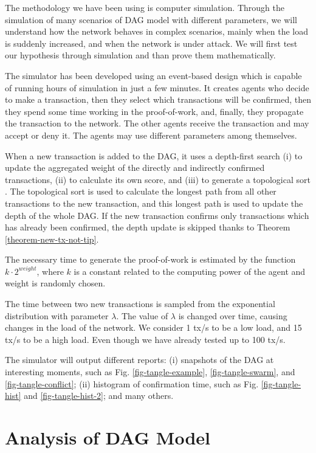The methodology we have been using is computer simulation. Through the simulation of many scenarios of DAG model with different parameters, we will understand how the network behaves in complex scenarios, mainly when the load is suddenly increased, and when the network is under attack. We will first test our hypothesis through simulation and than prove them mathematically.

The simulator has been developed using an event-based design which is capable of running hours of simulation in just a few minutes. It creates agents who decide to make a transaction, then they select which transactions will be confirmed, then they spend some time working in the proof-of-work, and, finally, they propagate the transaction to the network. The other agents receive the transaction and may accept or deny it. The agents may use different parameters among themselves.

When a new transaction is added to the DAG, it uses a depth-first search \citep{cormen2009introduction} (i) to update the aggregated weight of the directly and indirectly confirmed transactions, (ii) to calculate its own score, and (iii) to generate a topological sort \citep{cormen2009introduction}. The topological sort is used to calculate the longest path from all other transactions to the new transaction, and this longest path is used to update the depth of the whole DAG. If the new transaction confirms only transactions which has already been confirmed, the depth update is skipped thanks to Theorem \ref{theorem-new-tx-not-tip}.

The necessary time to generate the proof-of-work is estimated by the function $k \cdot 2^{weight}$, where $k$ is a constant related to the computing power of the agent and weight is randomly chosen.

The time between two new transactions is sampled from the exponential distribution with parameter $\lambda$. The value of $\lambda$ is changed over time, causing changes in the load of the network. We consider 1 tx/s to be a low load, and 15 tx/s to be a high load. Even though we have already tested up to 100 tx/s.

The simulator will output different reports: (i) snapshots of the DAG at interesting moments, such as Fig. \ref{fig-tangle-example}, \ref{fig-tangle-swarm}, and \ref{fig-tangle-conflict}; (ii) histogram of confirmation time, such as Fig. \ref{fig-tangle-hist} and \ref{fig-tangle-hist-2}; and many others.

\chapter{Analysis of DAG Model}

